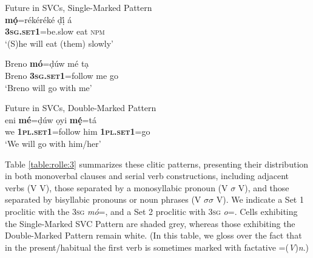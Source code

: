 \documentclass[output=paper]{langsci/langscibook}
\begin{document}
\ea\label{ex:rolle:17}
{Future in SVCs, Single-Marked Pattern}\\
    \ea 
\gll   \textbf{mọ́}=rékéréké     ḍị́   á\\ 
       \textbf{\textsc{3sg.set1}}=be.slow   eat   \textsc{npm}\\
\glt ‘(S)he will eat (them) slowly’ 

\ex\label{ex:rolle:18}
\gll   Breno  \textbf{mó}=ḍúw       mé   tạ\\ 
       Breno   \textbf{\textsc{3sg.set1}}=follow    me  go\\
\glt ‘Breno will go with me’
\z
\z 

\ea\label{ex:rolle:19}
{Future in SVCs, Double-Marked Pattern} \\
\gll   eni   \textbf{mé}=ḍúw     ọyi    \textbf{mẹ́}=tá\\ 
       we   \textbf{\textsc{1pl.set1}}=follow  him    \textbf{\textsc{1pl.set1}}=go\\
\glt ‘We will go with him/her’
\z

Table \ref{table:rolle:3} summarizes these clitic patterns, presenting their distribution in both monoverbal clauses and serial verb constructions, including adjacent verbs (V V), those separated by a monosyllabic pronoun (V $\sigma $ V), and those separated by bisyllabic pronouns or noun phrases (V $\sigma \sigma $ V). We indicate a Set 1 proclitic with the 3\textsc{sg} \textit{m\'o}=, and a Set 2 proclitic with 3\textsc{sg} \textit{o}=. Cells exhibiting the Single-Marked SVC Pattern are shaded grey, whereas those exhibiting the Double-Marked Pattern remain white. (In this table, we gloss over the fact that in the present/habitual the first verb is sometimes marked with factative =(\textit{V})\textit{n}.)
\end{document}
